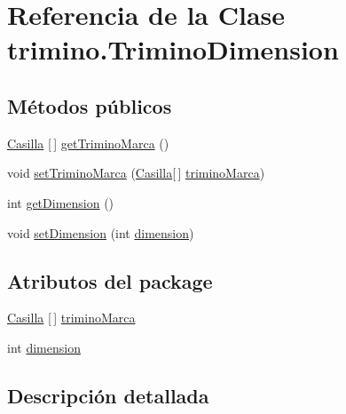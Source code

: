 \hypertarget{classtrimino_1_1TriminoDimension}{}\section{Referencia de la Clase trimino.\+Trimino\+Dimension}
\label{classtrimino_1_1TriminoDimension}
\subsection*{Métodos públicos}
\begin{DoxyCompactItemize}
\item 
\mbox{\hyperlink{classtrimino_1_1Casilla}{Casilla}} \mbox{[}$\,$\mbox{]} \mbox{\hyperlink{classtrimino_1_1TriminoDimension_aec4ac732ba7d51dc64ff20ec9ab4cba9}{get\+Trimino\+Marca}} ()
\item 
void \mbox{\hyperlink{classtrimino_1_1TriminoDimension_aa1efc24ad7ae3c8409650abfc7d000fe}{set\+Trimino\+Marca}} (\mbox{\hyperlink{classtrimino_1_1Casilla}{Casilla}}\mbox{[}$\,$\mbox{]} \mbox{\hyperlink{classtrimino_1_1TriminoDimension_a579a30dc8a06363a2261246dd4bebb83}{trimino\+Marca}})
\item 
int \mbox{\hyperlink{classtrimino_1_1TriminoDimension_a2b68da33e0776ee340b115c697551688}{get\+Dimension}} ()
\item 
void \mbox{\hyperlink{classtrimino_1_1TriminoDimension_aa06f4a7772d27e557a7890085ab0cbfd}{set\+Dimension}} (int \mbox{\hyperlink{classtrimino_1_1TriminoDimension_ae065548cf49a3a7bfb4eb9ab1f6386b1}{dimension}})
\end{DoxyCompactItemize}
\subsection*{Atributos del \textquotesingle{}package\textquotesingle{}}
\begin{DoxyCompactItemize}
\item 
\mbox{\hyperlink{classtrimino_1_1Casilla}{Casilla}} \mbox{[}$\,$\mbox{]} \mbox{\hyperlink{classtrimino_1_1TriminoDimension_a579a30dc8a06363a2261246dd4bebb83}{trimino\+Marca}}
\item 
int \mbox{\hyperlink{classtrimino_1_1TriminoDimension_ae065548cf49a3a7bfb4eb9ab1f6386b1}{dimension}}
\end{DoxyCompactItemize}


\subsection{Descripción detallada}


